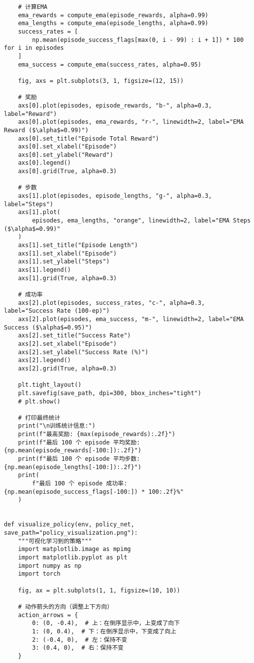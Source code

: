 \begin{verbatim}
    # 计算EMA
    ema_rewards = compute_ema(episode_rewards, alpha=0.99)
    ema_lengths = compute_ema(episode_lengths, alpha=0.99)
    success_rates = [
        np.mean(episode_success_flags[max(0, i - 99) : i + 1]) * 100 for i in episodes
    ]
    ema_success = compute_ema(success_rates, alpha=0.95)

    fig, axs = plt.subplots(3, 1, figsize=(12, 15))

    # 奖励
    axs[0].plot(episodes, episode_rewards, "b-", alpha=0.3, label="Reward")
    axs[0].plot(episodes, ema_rewards, "r-", linewidth=2, label="EMA Reward ($\alpha$=0.99)")
    axs[0].set_title("Episode Total Reward")
    axs[0].set_xlabel("Episode")
    axs[0].set_ylabel("Reward")
    axs[0].legend()
    axs[0].grid(True, alpha=0.3)

    # 步数
    axs[1].plot(episodes, episode_lengths, "g-", alpha=0.3, label="Steps")
    axs[1].plot(
        episodes, ema_lengths, "orange", linewidth=2, label="EMA Steps ($\alpha$=0.99)"
    )
    axs[1].set_title("Episode Length")
    axs[1].set_xlabel("Episode")
    axs[1].set_ylabel("Steps")
    axs[1].legend()
    axs[1].grid(True, alpha=0.3)

    # 成功率
    axs[2].plot(episodes, success_rates, "c-", alpha=0.3, label="Success Rate (100-ep)")
    axs[2].plot(episodes, ema_success, "m-", linewidth=2, label="EMA Success ($\alpha$=0.95)")
    axs[2].set_title("Success Rate")
    axs[2].set_xlabel("Episode")
    axs[2].set_ylabel("Success Rate (%)")
    axs[2].legend()
    axs[2].grid(True, alpha=0.3)

    plt.tight_layout()
    plt.savefig(save_path, dpi=300, bbox_inches="tight")
    # plt.show()

    # 打印最终统计
    print("\n训练统计信息:")
    print(f"最高奖励: {max(episode_rewards):.2f}")
    print(f"最后 100 个 episode 平均奖励: {np.mean(episode_rewards[-100:]):.2f}")
    print(f"最后 100 个 episode 平均步数: {np.mean(episode_lengths[-100:]):.2f}")
    print(
        f"最后 100 个 episode 成功率: {np.mean(episode_success_flags[-100:]) * 100:.2f}%"
    )


def visualize_policy(env, policy_net, save_path="policy_visualization.png"):
    """可视化学习到的策略"""
    import matplotlib.image as mpimg
    import matplotlib.pyplot as plt
    import numpy as np
    import torch

    fig, ax = plt.subplots(1, 1, figsize=(10, 10))

    # 动作箭头的方向（调整上下方向）
    action_arrows = {
        0: (0, -0.4),  # 上：在倒序显示中，上变成了向下
        1: (0, 0.4),  # 下：在倒序显示中，下变成了向上
        2: (-0.4, 0),  # 左：保持不变
        3: (0.4, 0),  # 右：保持不变
    }


\end{verbatim}
